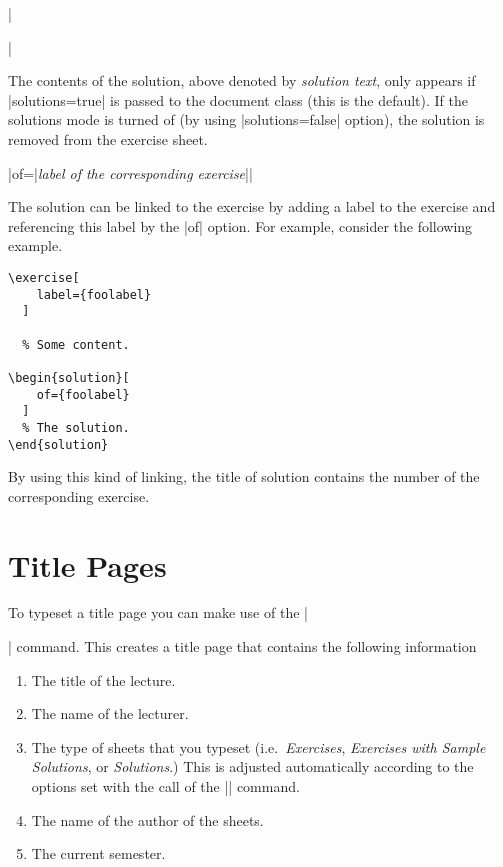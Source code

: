 \documentclass[a4paper,fleqn]{report}
\def\syntaxdefaultarg#1{\hfill\texttt{\small #1}\par\smallskip\noindent\ignorespaces}
\def\metaargument#1{\textit{\small #1}}
\begin{document}
\begin{syntax}
  ||
  \syntaxdefaultarg{}
  The contents of the solution, above denoted by
  \metaargument{solution text}, only appears if |solutions=true| is
  passed to the document class (this is the default). If the solutions
  mode is turned of (by using |solutions=false| option), the solution
  is removed from the exercise sheet.

  \begin{syntax}
    |of={|\metaargument{label of the corresponding exercise}|}| 
    \syntaxdefaultarg{}
    The solution can be linked to the exercise by adding a label to
    the exercise and referencing this label by the |of| option. For
    example, consider the following example.
    \begin{lstlisting}
\exercise[
    label={foolabel}
  ]

  % Some content.

\begin{solution}[
    of={foolabel}
  ]
  % The solution.
\end{solution}

    \end{lstlisting}
    \noindent By using this kind of linking, the title of solution
    contains the number of the corresponding exercise.
  \end{syntax}
\end{syntax}


\section{Title Pages}

To typeset a title page you can make use of the |\maketitle| command.
This creates a title page that contains the following information
\begin{enumerate}
  \item The title of the lecture.
  \item The name of the lecturer.
  \item The type of sheets that you typeset (i.e.\ 
    \emph{Exercises},
    \emph{Exercises with Sample Solutions}, or 
    \emph{Solutions}.) This is adjusted automatically according to the
      options set with the call of the |\sheetconf| command.
  \item The name of the author of the sheets.
  \item The current semester.
\end{enumerate}
\end{document}
